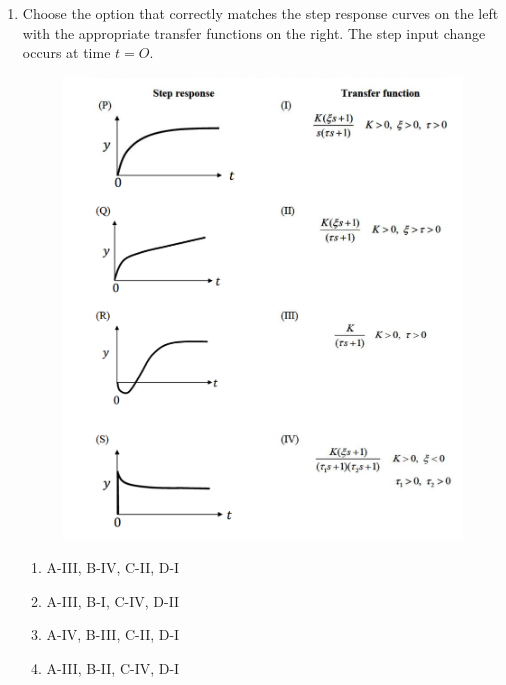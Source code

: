 \documentclass[journal]{IEEEtran}
\begin{document}
\begin{enumerate}
\begin{multicols}{4}
    \begin{enumerate}
        \item $\frac{2}{\brak{56s + 1}^{2}}$
        \item $\frac{2}{\brak{62s + 1}^{2}}$
        \item $\frac{2}{\brak{36s + 1}^{2}}$
        \item $\frac{2}{\brak{49s + 1}^{2}}$
    \end{enumerate}
\end{multicols}
\newpage 
    \item Choose the option that correctly matches the step response curves on the left with the appropriate transfer functions on the right. The step input change occurs at time $t=O$. 
\begin{figure}[h!]
  \centering
    \includegraphics[width=0.8\linewidth]{Fig/34.png}
   
\end{figure}
\begin{multicols}{2}
    \begin{enumerate}
        \item A-III, B-IV, C-II, D-I
        \item A-III, B-I, C-IV, D-II
        \item A-IV, B-III, C-II, D-I
        \item A-III, B-II, C-IV, D-I
    \end{enumerate}
\end{multicols}


\end{enumerate}
\end{document}
